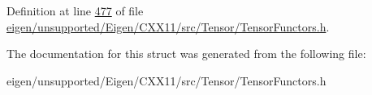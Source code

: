 Definition at line \hyperlink{eigen_2unsupported_2_eigen_2_c_x_x11_2src_2_tensor_2_tensor_functors_8h_source_l00477}{477} of file \hyperlink{eigen_2unsupported_2_eigen_2_c_x_x11_2src_2_tensor_2_tensor_functors_8h_source}{eigen/unsupported/\+Eigen/\+C\+X\+X11/src/\+Tensor/\+Tensor\+Functors.\+h}.



The documentation for this struct was generated from the following file\+:\begin{DoxyCompactItemize}
\item 
eigen/unsupported/\+Eigen/\+C\+X\+X11/src/\+Tensor/\+Tensor\+Functors.\+h\end{DoxyCompactItemize}
